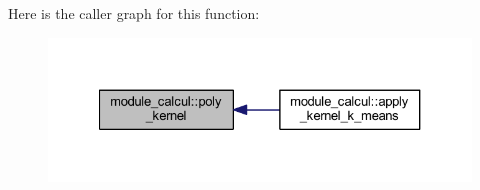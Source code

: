 Here is the caller graph for this function\+:\nopagebreak
\begin{figure}[H]
\begin{center}
\leavevmode
\includegraphics[width=327pt]{namespacemodule__calcul_a97fd8d0653adb9041ab3ca899c0d0f91_icgraph}
\end{center}
\end{figure}


